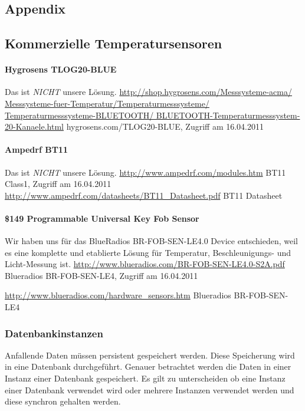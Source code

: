 \begin{appendix}
\section{Appendix}
\label{sec:appendix}

\subsection{Kommerzielle Temperatursensoren}
	\paragraph{Hygrosens TLOG20-BLUE}
		Das ist \textit{NICHT} unsere Lösung.
		\url{http://shop.hygrosens.com/Messsysteme-acma/
			Messsysteme-fuer-Temperatur/Temperaturmesssysteme/
			Temperaturmesssysteme-BLUETOOTH/
			BLUETOOTH-Temperaturmesssystem-20-Kanaele.html}
			{hygrosens.com/TLOG20-BLUE, Zugriff am 16.04.2011}
	\par
	
	\paragraph{Ampedrf BT11}
		Das ist \textit{NICHT} unsere Lösung.
		\url{http://www.ampedrf.com/modules.htm}
		{BT11 Class1, Zugriff am 16.04.2011}
		\url{http://www.ampedrf.com/datasheets/BT11_Datasheet.pdf}
		{BT11 Datasheet}
	\par 

	\paragraph{\$149 Programmable Universal Key Fob Sensor}
		Wir haben uns für das BlueRadios BR-FOB-SEN-LE4.0 Device  entschieden, weil es
		eine komplette und etablierte Lösung für Temperatur, Beschleunigungs- und
		Licht-Messung ist.
		\url{http://www.blueradios.com/BR-FOB-SEN-LE4.0-S2A.pdf}
		{Blueradios BR-FOB-SEN-LE4, Zugriff am 16.04.2011}
		
		\url{http://www.blueradios.com/hardware_sensors.htm}
		{Blueradios BR-FOB-SEN-LE4}
	\par






	\subsubsection{Datenbankinstanzen}
	Anfallende Daten müssen persistent gespeichert werden. Diese Speicherung wird in eine Datenbank durchgeführt. Genauer betrachtet werden die Daten in einer Instanz einer Datenbank gespeichert. Es gilt zu unterscheiden ob eine Instanz einer Datenbank verwendet wird oder mehrere Instanzen verwendet werden und diese synchron gehalten werden.


\end{appendix}
